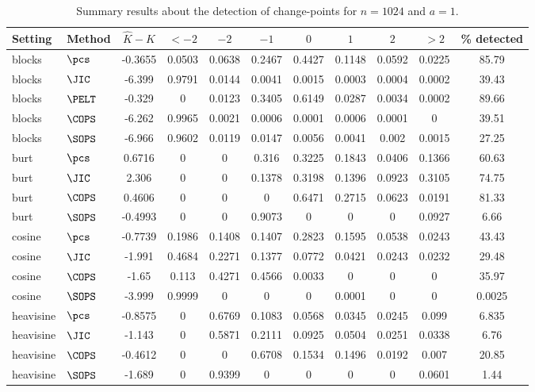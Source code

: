 \begin{table}[ht]
\centering
\begin{tabular}{llccccccccc}
  \hline
Setting & Method & $\hat{K} - K$ & $< -2$ & $-2$ & $-1$ & $0$ & $1$ & $2$ & $> 2$ & \% detected \\ 
  \hline
blocks & $\pcs$ & -0.3655 & 0.0503 & 0.0638 & 0.2467 & 0.4427 & 0.1148 & 0.0592 & 0.0225 & 85.79 \\ 
  blocks & $\JIC$ & -6.399 & 0.9791 & 0.0144 & 0.0041 & 0.0015 & 0.0003 & 0.0004 & 0.0002 & 39.43 \\ 
  blocks & $\PELT$ & -0.329 &     0 & 0.0123 & 0.3405 & 0.6149 & 0.0287 & 0.0034 & 0.0002 & 89.66 \\ 
  blocks & $\COPS$ & -6.262 & 0.9965 & 0.0021 & 0.0006 & 0.0001 & 0.0006 & 0.0001 &     0 & 39.51 \\ 
   \hline
blocks & $\SOPS$ & -6.966 & 0.9602 & 0.0119 & 0.0147 & 0.0056 & 0.0041 & 0.002 & 0.0015 & 27.25 \\ 
  burt & $\pcs$ & 0.6716 &     0 &     0 & 0.316 & 0.3225 & 0.1843 & 0.0406 & 0.1366 & 60.63 \\ 
   \hline
burt & $\JIC$ & 2.306 &     0 &     0 & 0.1378 & 0.3198 & 0.1396 & 0.0923 & 0.3105 & 74.75 \\ 
  burt & $\COPS$ & 0.4606 &     0 &     0 &     0 & 0.6471 & 0.2715 & 0.0623 & 0.0191 & 81.33 \\ 
   \hline
burt & $\SOPS$ & -0.4993 &     0 &     0 & 0.9073 &     0 &     0 &     0 & 0.0927 &  6.66 \\ 
  cosine & $\pcs$ & -0.7739 & 0.1986 & 0.1408 & 0.1407 & 0.2823 & 0.1595 & 0.0538 & 0.0243 & 43.43 \\ 
   \hline
cosine & $\JIC$ & -1.991 & 0.4684 & 0.2271 & 0.1377 & 0.0772 & 0.0421 & 0.0243 & 0.0232 & 29.48 \\ 
  cosine & $\COPS$ & -1.65 & 0.113 & 0.4271 & 0.4566 & 0.0033 &     0 &     0 &     0 & 35.97 \\ 
  cosine & $\SOPS$ & -3.999 & 0.9999 &     0 &     0 &     0 & 0.0001 &     0 &     0 & 0.0025 \\ 
  heavisine & $\pcs$ & -0.8575 &     0 & 0.6769 & 0.1083 & 0.0568 & 0.0345 & 0.0245 & 0.099 & 6.835 \\ 
  heavisine & $\JIC$ & -1.143 &     0 & 0.5871 & 0.2111 & 0.0925 & 0.0504 & 0.0251 & 0.0338 &  6.76 \\ 
  heavisine & $\COPS$ & -0.4612 &     0 &     0 & 0.6708 & 0.1534 & 0.1496 & 0.0192 & 0.007 & 20.85 \\ 
  heavisine & $\SOPS$ & -1.689 &     0 & 0.9399 &     0 &     0 &     0 &     0 & 0.0601 &  1.44 \\ 
  \end{tabular}
\caption{Summary results about the detection of change-points for $n = 1024$ and $a = 1$.} 
\label{tab:CPn1024a1}
\end{table}

